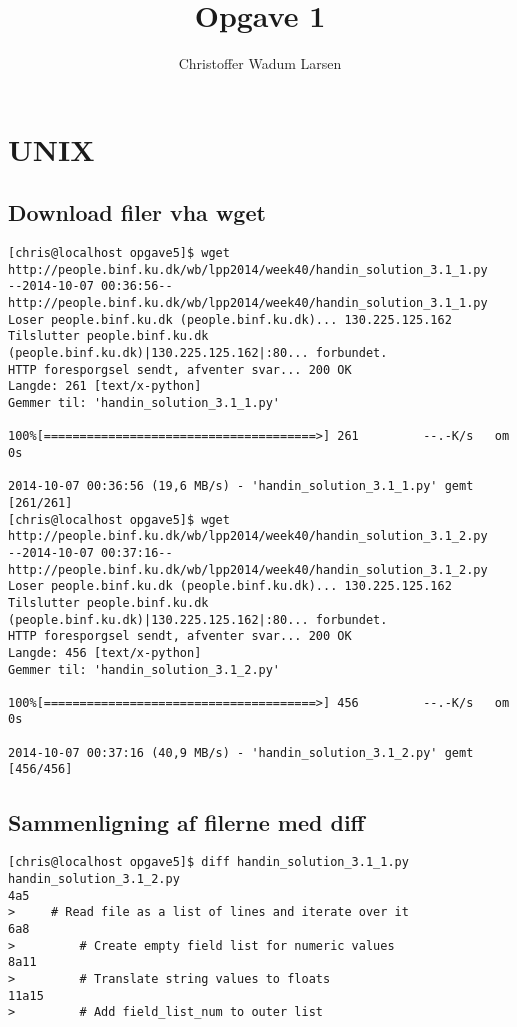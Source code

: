 \documentclass[12pt]{article}
\title{Opgave 1}
\author{Christoffer Wadum Larsen}
\begin{document}
\maketitle

\section{UNIX}

\subsection{Download filer vha wget}

\begin{lstlisting}
[chris@localhost opgave5]$ wget http://people.binf.ku.dk/wb/lpp2014/week40/handin_solution_3.1_1.py
--2014-10-07 00:36:56--  http://people.binf.ku.dk/wb/lpp2014/week40/handin_solution_3.1_1.py
Loser people.binf.ku.dk (people.binf.ku.dk)... 130.225.125.162
Tilslutter people.binf.ku.dk (people.binf.ku.dk)|130.225.125.162|:80... forbundet.
HTTP foresporgsel sendt, afventer svar... 200 OK
Langde: 261 [text/x-python]
Gemmer til: 'handin_solution_3.1_1.py'

100%[======================================>] 261         --.-K/s   om 0s      

2014-10-07 00:36:56 (19,6 MB/s) - 'handin_solution_3.1_1.py' gemt [261/261]
[chris@localhost opgave5]$ wget http://people.binf.ku.dk/wb/lpp2014/week40/handin_solution_3.1_2.py
--2014-10-07 00:37:16--  http://people.binf.ku.dk/wb/lpp2014/week40/handin_solution_3.1_2.py
Loser people.binf.ku.dk (people.binf.ku.dk)... 130.225.125.162
Tilslutter people.binf.ku.dk (people.binf.ku.dk)|130.225.125.162|:80... forbundet.
HTTP foresporgsel sendt, afventer svar... 200 OK
Langde: 456 [text/x-python]
Gemmer til: 'handin_solution_3.1_2.py'

100%[======================================>] 456         --.-K/s   om 0s      

2014-10-07 00:37:16 (40,9 MB/s) - 'handin_solution_3.1_2.py' gemt [456/456]
\end{lstlisting}

\subsection{Sammenligning af filerne med diff}

\begin{lstlisting}
[chris@localhost opgave5]$ diff handin_solution_3.1_1.py handin_solution_3.1_2.py 
4a5
>     # Read file as a list of lines and iterate over it
6a8
>         # Create empty field list for numeric values
8a11
>         # Translate string values to floats
11a15
>         # Add field_list_num to outer list
\end{lstlisting}
\end{document}
